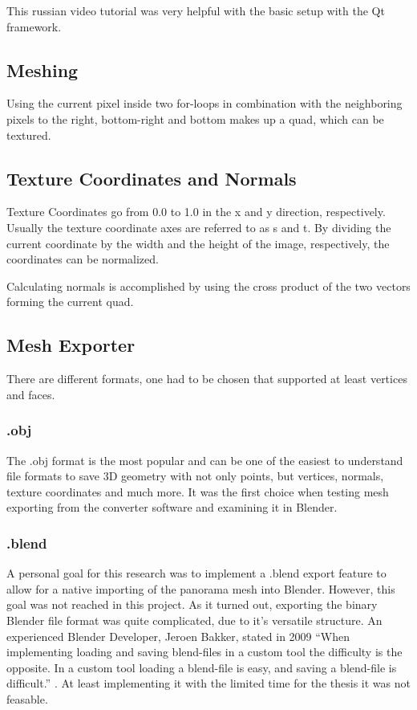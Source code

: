 This russian video tutorial was very helpful with the basic setup with the Qt framework.

\cite{ytQtOpenGL}

\subsection{Meshing}

Using the current pixel inside two for-loops in combination with the neighboring pixels to the right, bottom-right and bottom makes up a quad, which can be textured.

\subsection{Texture Coordinates and Normals}

Texture Coordinates go from 0.0 to 1.0 in the x and y direction, respectively. Usually the texture coordinate axes are referred to as s and t. By dividing the current coordinate by the width and the height of the image, respectively, the coordinates can be normalized.

Calculating normals is accomplished by using the cross product of the two vectors forming the current quad.

\subsection{Mesh Exporter}

There are different formats, one had to be chosen that supported at least vertices and faces.

\subsubsection{.obj}

The .obj format is the most popular and can be one of the easiest to understand file formats to save 3D geometry with not only points, but vertices, normals, texture coordinates and much more. It was the first choice when testing mesh exporting from the converter software and examining it in Blender.

\subsubsection{.blend}

A personal goal for this research was to implement a .blend export feature to allow for a native importing of the panorama mesh into Blender. However, this goal was not reached in this project. As it turned out, exporting the binary Blender file format was quite complicated, due to it's versatile structure. An experienced Blender Developer, Jeroen Bakker, stated in 2009 “When implementing loading and saving blend-files in a custom tool the difficulty is the opposite. In a custom tool loading a blend-file is easy, and saving a blend-file is difficult.” \parencite[see]{webMysteryOfTheBlend}. At least implementing it with the limited time for the thesis it was not feasable.



